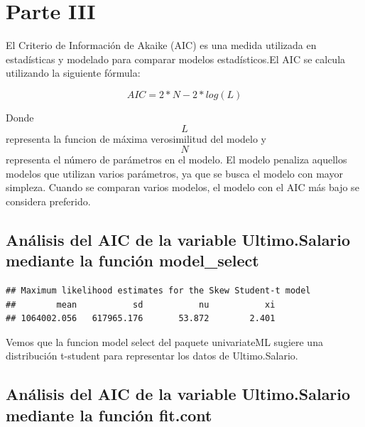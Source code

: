 \documentclass[
]{article}
\newenvironment{Shaded}{\begin{snugshade}}{\end{snugshade}}
\newcommand{\FunctionTok}[1]{\textcolor[rgb]{0.13,0.29,0.53}{\textbf{#1}}}
\newcommand{\NormalTok}[1]{#1}
\newcommand{\SpecialCharTok}[1]{\textcolor[rgb]{0.81,0.36,0.00}{\textbf{#1}}}
\begin{document}
\hypertarget{parte-iii}{%
\section{Parte III}\label{parte-iii}}

El Criterio de Información de Akaike (AIC) es una medida utilizada en
estadísticas y modelado para comparar modelos estadísticos.El AIC se
calcula utilizando la siguiente fórmula:

\[ AIC= 2*N−2*log(L) \]

Donde \[L\] representa la funcion de máxima verosimilitud del modelo y
\[N\] representa el número de parámetros en el modelo. El modelo
penaliza aquellos modelos que utilizan varios parámetros, ya que se
busca el modelo con mayor simpleza. Cuando se comparan varios modelos,
el modelo con el AIC más bajo se considera preferido.

\hypertarget{anuxe1lisis-del-aic-de-la-variable-ultimo.salario-mediante-la-funciuxf3n-model_select}{%
\subsection{Análisis del AIC de la variable Ultimo.Salario mediante la
función
model\_select}\label{anuxe1lisis-del-aic-de-la-variable-ultimo.salario-mediante-la-funciuxf3n-model_select}}

\begin{Shaded}
\end{Shaded}

\begin{verbatim}
## Maximum likelihood estimates for the Skew Student-t model 
##        mean           sd           nu           xi  
## 1064002.056   617965.176       53.872        2.401
\end{verbatim}

Vemos que la funcion model select del paquete univariateML sugiere una
distribución t-student para representar los datos de Ultimo.Salario.

\hypertarget{anuxe1lisis-del-aic-de-la-variable-ultimo.salario-mediante-la-funciuxf3n-fit.cont}{%
\subsection{Análisis del AIC de la variable Ultimo.Salario mediante la
función
fit.cont}\label{anuxe1lisis-del-aic-de-la-variable-ultimo.salario-mediante-la-funciuxf3n-fit.cont}}
\end{document}
